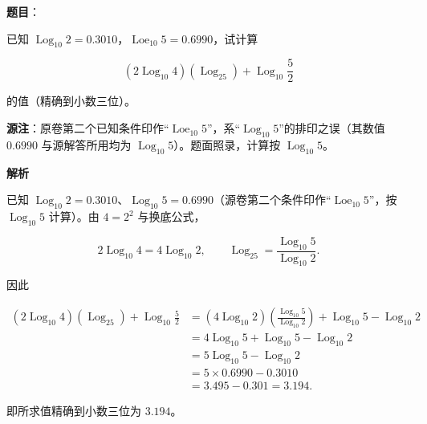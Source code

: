\begin{answer}

\textbf{题目}：

已知 $\operatorname{Log}_{10}2=0.3010$，$\operatorname{Loe}_{10}5=0.6990$，试计算

\nopagebreak[4]
\[
(2\operatorname{Log}_{10}4)(\operatorname{Log}_25)+\operatorname{Log}_{10}\frac52
\]

的值（精确到小数三位）。

\begin{gktip}
\textbf{源注}：原卷第二个已知条件印作“$\operatorname{Loe}_{10}5$”，系“$\operatorname{Log}_{10}5$”的排印之误（其数值 $0.6990$ 与源解答所用均为 $\operatorname{Log}_{10}5$）。题面照录，计算按 $\operatorname{Log}_{10}5$。
\end{gktip}

\textbf{解析}

已知 $\operatorname{Log}_{10}2=0.3010$、$\operatorname{Log}_{10}5=0.6990$（源卷第二个条件印作“$\operatorname{Loe}_{10}5$”，按 $\operatorname{Log}_{10}5$ 计算）。由 $4=2^2$ 与换底公式，

\nopagebreak[4]
\[
2\operatorname{Log}_{10}4=4\operatorname{Log}_{10}2,
\qquad
\operatorname{Log}_25=\frac{\operatorname{Log}_{10}5}{\operatorname{Log}_{10}2}.
\]

因此

\nopagebreak[4]
\[
\begin{aligned}
(2\operatorname{Log}_{10}4)(\operatorname{Log}_25)+\operatorname{Log}_{10}\frac52
&=(4\operatorname{Log}_{10}2)\left(\frac{\operatorname{Log}_{10}5}{\operatorname{Log}_{10}2}\right)
+\operatorname{Log}_{10}5-\operatorname{Log}_{10}2\\
&=4\operatorname{Log}_{10}5+\operatorname{Log}_{10}5-\operatorname{Log}_{10}2\\
&=5\operatorname{Log}_{10}5-\operatorname{Log}_{10}2\\
&=5\times0.6990-0.3010\\
&=3.495-0.301=3.194.
\end{aligned}
\]

即所求值精确到小数三位为 $3.194$。


\end{answer}

